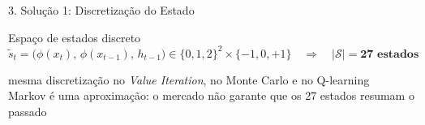 \documentclass[aspectratio=169,10pt,t]{beamer}
\begin{document}
\begin{frame}{3. Solução 1: Discretização do Estado}
  \vskip 0.1cm

  \begin{block}{Espaço de estados discreto}
    \[
      \tilde{s}_t = \big(\phi(x_t),\, \phi(x_{t-1}),\, h_{t-1}\big) \in \{0,1,2\}^2 \times \{-1,0,+1\}
      \quad\Rightarrow\quad |\mathcal{S}| = \mathbf{27\text{ estados}}
    \]
    {\centering\footnotesize mesma discretização no \textit{Value Iteration}, no Monte Carlo e no Q-learning\\
    Markov é uma aproximação: o mercado não garante que os 27 estados resumam o passado\par}
  \end{block}

\end{frame}

\end{document}
